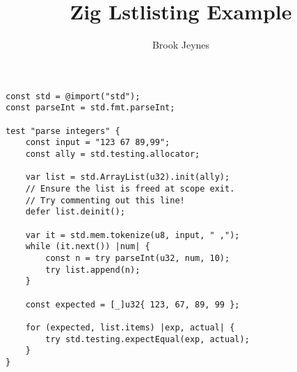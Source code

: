 \documentclass{article}
\title{Zig Lstlisting Example}
\author{Brook Jeynes}
\begin{document}
    \maketitle

    \begin{lstlisting}[language=Zig, caption=Example from https://ziglang.org/]
const std = @import("std");
const parseInt = std.fmt.parseInt;

test "parse integers" {
    const input = "123 67 89,99";
    const ally = std.testing.allocator;

    var list = std.ArrayList(u32).init(ally);
    // Ensure the list is freed at scope exit.
    // Try commenting out this line!
    defer list.deinit();

    var it = std.mem.tokenize(u8, input, " ,");
    while (it.next()) |num| {
        const n = try parseInt(u32, num, 10);
        try list.append(n);
    }

    const expected = [_]u32{ 123, 67, 89, 99 };

    for (expected, list.items) |exp, actual| {
        try std.testing.expectEqual(exp, actual);
    }
}
    \end{lstlisting}
\end{document}
